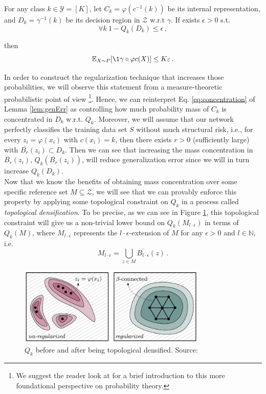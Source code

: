 \documentclass[../main.tex]{subfiles}
\begin{document}
\begin{lemma}
\label{lem:genErr}
For any class $k\in \mathcal{Y} = [K]$, let $C_k=\varphi(c^{-1}(k))$ be its internal representation, and $D_k= \gamma^{-1}(k)$ be its decision region in $\mathcal{Z}$ w.r.t $\gamma$. If exists $\epsilon >0$ s.t.
\begin{equation}
\label{eq:concentration}
 \forall k\ 1-Q_k(D_k) \leq \epsilon\,,   
\end{equation}

then 
\[
\E_{X \sim P}[\1{\gamma \circ \varphi}{c}(X)] \leq K\epsilon\,. 
\]
\end{lemma}

In order to construct the regularization technique that increases those probabilities, we will observe this statement from a measure-theoretic probabilistic point of view \footnote{We suggest the reader look at \cite[Appendix ~ B]{schervish_theory_1995} for a brief introduction to this more foundational perspective on probability theory.}. Hence, we can reinterpret Eq. \ref{eq:concentration} of Lemma \ref{lem:genErr} as controlling how much probability mass of $C_k$ is concentrated in $D_k$ w.r.t. $Q_k$. Moreover, we will assume that our network perfectly classifies the training data set $S$ without much structural risk, i.e., for every $z_i=\varphi(x_i)$ with $c(x_i)=k$, then there exists $r>0$ (sufficiently large) with $\overline{B_r}(z_i)\subset D_k$. Then we can see that increasing the mass concentration in $\overline{B_r}(z_i)$, $Q_k(\overline{B_r}(z_i))$, will reduce generalization error since we will in turn increase $Q_k(D_k)$.\\

Now that we know the benefits of obtaining mass concentration over some specific reference set $M \subseteq \mathcal{Z}$, we will see that we can provably enforce this property by applying some topological constraint on $Q_k$ in a process called \emph{topological densification}. To be precise, as we can see in Figure \ref{fig:densiScheme}, this topological constraint will give us a non-trivial lower bound on $Q_k(M_{l\cdot \epsilon})$ in terms of $Q_k(M)$, where $M_{l\cdot \epsilon}$ represents the $l\cdot \epsilon$-extension of $M$ for any $\epsilon>0$ and $l\in \mathbb{N}$, i.e.
\[
M_{l\cdot \epsilon} = \bigcup_{z\in M} \overline{B_{l\cdot \epsilon}}(z)\,.
\]

\begin{figure}[!ht]
    \centering
    \includegraphics[width=0.8\textwidth]{figures/bg/densification.png} 
    \caption{$Q_k$ before and after being topological densified. Source: \cite{hofer_densified_2021}}
    \label{fig:densiScheme}
\end{figure}
\end{document}
